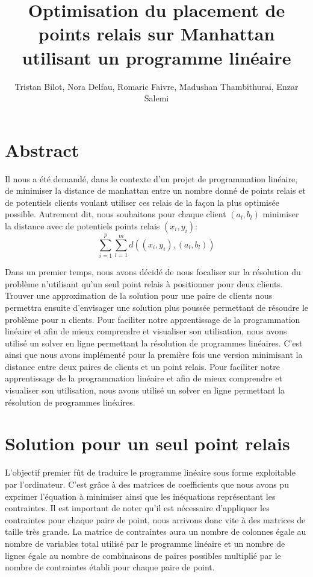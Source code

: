 \documentclass[12pt, oneside]{article}
\begin{document}
\title{Optimisation du placement de points relais sur Manhattan utilisant un programme linéaire}
\author{Tristan Bilot, Nora Delfau, Romaric Faivre, Madushan Thambithurai, Enzar Salemi}
\maketitle

\section{Abstract}
Il nous a été demandé, dans le contexte d’un projet de programmation linéaire, de minimiser la distance de manhattan entre un nombre donné de points relais et de potentiels clients voulant utiliser ces relais de la façon la plus optimisée possible. Autrement dit, nous souhaitons pour chaque client \((a_l, b_l)\) minimiser la distance avec de potentiels points relais \((x_i, y_i) \): \[ \sum_{i=1}^{p} \sum_{l=1}^{m} d((x_i, y_i), (a_l, b_l)) \]

Dans un premier temps, nous avons décidé de nous focaliser sur la résolution du problème n'utilisant qu'un seul point relais à positionner pour deux clients. Trouver une approximation de la solution pour une paire de clients nous permettra ensuite d'envisager une solution plus poussée permettant de résoudre le problème pour n clients.
Pour faciliter notre apprentissage de la programmation linéaire et afin de mieux comprendre et visualiser son utilisation, nous avons utilisé un solver en ligne permettant la résolution de programmes linéaires.
C'est ainsi que nous avons implémenté pour la première fois une version minimisant la distance entre deux paires de clients et un point relais.
Pour faciliter notre apprentissage de la programmation linéaire et afin de mieux comprendre et visualiser son utilisation, nous avons utilisé un solver en ligne permettant la résolution de programmes linéaires.

\section{Solution pour un seul point relais}
L'objectif premier fût de traduire le programme linéaire sous forme exploitable par l'ordinateur.
C'est grâce à des matrices de coefficients que nous avons pu exprimer l'équation à minimiser ainsi que les inéquations représentant les contraintes.
Il est important de noter qu'il est nécessaire d'appliquer les contraintes pour chaque paire de point, nous arrivons donc vite à des matrices de taille très grande. La matrice de contraintes aura un nombre de colonnes égale au nombre de variables total utilisé par le programme linéaire et un nombre de lignes égale au nombre de combinaisons de paires possibles multiplié par le nombre de contraintes établi pour chaque paire de point.
\end{document}
